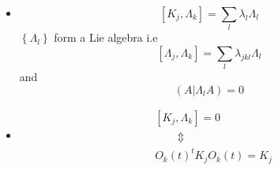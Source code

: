 \documentclass[aps,preprint]{revtex4}%
\begin{document}
\begin{itemize}
\item
\begin{equation}
\left[  K_{j},\Lambda_{k}\right]  =\sum_{l}\lambda_{l}\Lambda_{l}%
\end{equation}
$\left\{  \Lambda_{l}\right\}  $ form a Lie algebra i.e
\begin{equation}
\left[  \Lambda_{j},\Lambda_{k}\right]  =\sum_{l}\lambda_{jkl}\Lambda_{l}%
\end{equation}
and
\begin{equation}
\left(  A\left\vert \Lambda_{l}A\right.  \right)  =0
\end{equation}


\item
\begin{align}
& \left[  K_{j},\Lambda_{k}\right]  =0\\
& \qquad\left.  \Updownarrow\right.  \\
& O_{k}\left(  t\right)  ^{t}K_{j}O_{k}\left(  t\right)  =K_{j}%
\end{align}

\end{itemize}
\end{document}
